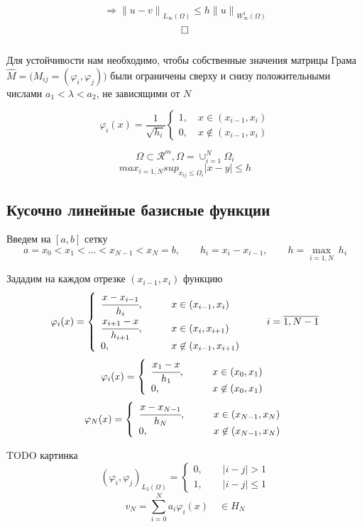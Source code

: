\documentclass[12pt, a4paper]{article}
\newcommand{\Sum}{\sum\limits}
\begin{document}
\[  \Rightarrow {\|u -v\|}_{L_{\infty}(\Omega)} \leq h {\|u\|}_{W_\infty^1 (\Omega)} \]
\[ \hfill \square \] \\

Для устойчивости нам необходимо, чтобы собственные значения матрицы Грама $ \widehat{M} = \bigl(M_{ij} = (\varphi_i, \varphi_j)\bigr) $  были ограничены сверху и снизу положительными числами $ a_1 < \lambda < a_2 $, не зависящими от $N$

\[ {\varphi_i} (x) = \frac{1}{\sqrt{h_i}} \left\{ \begin{array}{l}
	1, \quad x \in (x_{i-1}, x_i) \\
	0, \quad x \not \in (x_{i-1}, x_i)
\end{array} \right. \]

\[ \Omega \subset \mathcal{R}^m, \Omega = \cup^{N}_{i=1} \Omega_i \]
\[ {max}_{i=\overline{1, N}} {sup}_{x_{ij} \leq \Omega_i} |x-y| \leq h \]

\subsection{Кусочно линейные базисные функции}

Введем на $[a, b]$ сетку 
\[ a = x_0 < x_1 < ... < x_{N-1} < x_N = b, \qquad h_i = x_i - x_{i-1}, \qquad h = \underset{i=1, N}{\max} \ h_i \]

Зададим на каждом отрезке $(x_{i-1}, x_i)$ функцию
\[ \varphi_i (x) =  \left\{ \begin{array}{ll}
	\cfrac{x - x_{i-1}}{h_i}, \qquad & x\in (x_{i-1} , x_i) \\
	\cfrac{x_{i+1} - x}{h_{i+1}}, \qquad & x \in (x_{i}, x_{i+1}) \\
	0, \qquad & x \not \in (x_{i-1}, x_{i+1})
\end{array} \right. \qquad i = \overline{1, N-1} \]
\[ \varphi_i (x) =  \left\{ \begin{array}{ll}
	\cfrac{x_1 - x}{h_1}, \qquad & x \in (x_0, x_1) \\
	0, \qquad & x \not \in (x_0, x_1)
\end{array} \right. \]
\[ \varphi_N (x) =  \left\{ \begin{array}{ll}
	\cfrac{x - x_{N-1}}{h_N}, \qquad & x\in (x_{N-1} , x_N) \\
	0, \qquad & x \not \in (x_{N-1}, x_N)
\end{array} \right. \]

TODO картинка
\[ {(\varphi_i, \varphi_j)}_{L_2(\Omega)} = \left\{ \begin{array}{l}
	0, \qquad |i-j| > 1 \\
	1, \qquad |i-j| \leq 1
\end{array} \right. \]
\[ v_N = \Sum_{i = 0}^{N} a_i \varphi_i(x) \quad \in H_N \]
\end{document}

